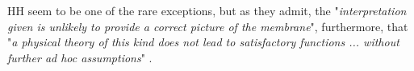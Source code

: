 \gls{HH}  seem to be one of the rare exceptions, but as they admit, the "\textit{interpretation given is unlikely to provide a correct picture of the
membrane}", furthermore, that "\textit{a physical theory of this kind does not lead to
satisfactory functions ... without further ad hoc assumptions}"  \cite{HodgkinHuxley:1952}.
